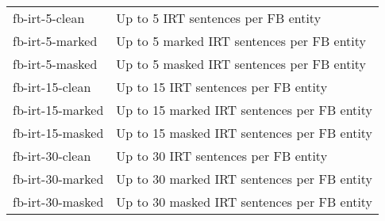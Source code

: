 \begin{tabular}{| l | l |}
    \hline

    fb-irt-5-clean    & Up to 5 IRT sentences per FB entity            \\
    fb-irt-5-marked   & Up to 5 marked IRT sentences per FB entity     \\
    fb-irt-5-masked   & Up to 5 masked IRT sentences per FB entity     \\

    \hline

    fb-irt-15-clean   & Up to 15 IRT sentences per FB entity           \\
    fb-irt-15-marked  & Up to 15 marked IRT sentences per FB entity    \\
    fb-irt-15-masked  & Up to 15 masked IRT sentences per FB entity    \\

    \hline

    fb-irt-30-clean   & Up to 30 IRT sentences per FB entity           \\
    fb-irt-30-marked  & Up to 30 marked IRT sentences per FB entity    \\
    fb-irt-30-masked  & Up to 30 masked IRT sentences per FB entity    \\

    \hline
\end{tabular}
